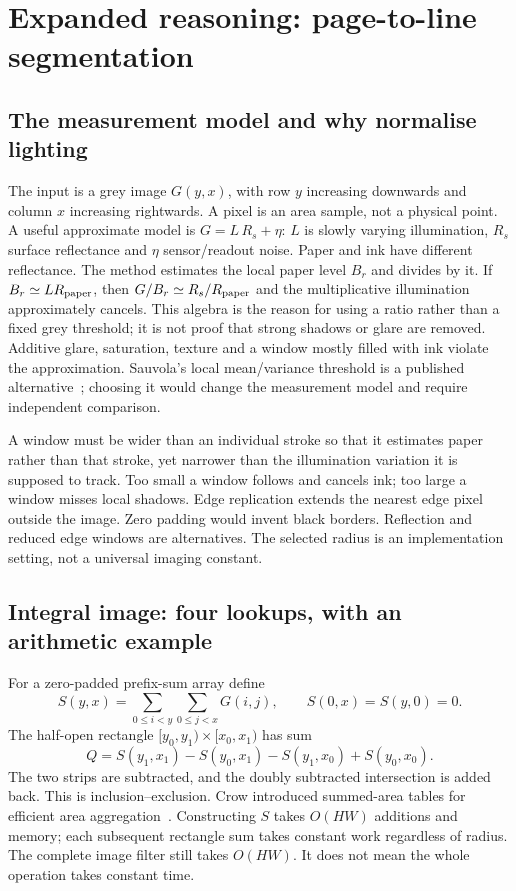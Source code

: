 \section{Expanded reasoning: page-to-line segmentation}
\label{sec:expand-segment}
\subsection{The measurement model and why normalise lighting}
The input is a grey image $G(y,x)$, with row $y$ increasing downwards and
column $x$ increasing rightwards. A pixel is an area sample, not a physical
point. A useful approximate model is $G=L\,R_s+\eta$: $L$ is slowly varying
illumination, $R_s$ surface reflectance and $\eta$ sensor/readout noise.
Paper and ink have different reflectance. The method estimates the local
paper level $B_r$ and divides by it. If $B_r\simeq L R_{\rm paper}$,
then $G/B_r\simeq R_s/R_{\rm paper}$ and the multiplicative illumination
approximately cancels. This algebra is the reason for using a ratio rather
than a fixed grey threshold; it is not proof that strong shadows or glare
are removed. Additive glare, saturation, texture and a window mostly filled
with ink violate the approximation. Sauvola's local mean/variance threshold
is a published alternative~\cite{sauvola2000}; choosing it would change the
measurement model and require independent comparison.

A window must be wider than an individual stroke so that it estimates paper
rather than that stroke, yet narrower than the illumination variation it
is supposed to track. Too small a window follows and cancels ink; too large
a window misses local shadows. Edge replication extends the nearest edge
pixel outside the image. Zero padding would invent black borders. Reflection
and reduced edge windows are alternatives. The selected radius is an
implementation setting, not a universal imaging constant.

\subsection{Integral image: four lookups, with an arithmetic example}
For a zero-padded prefix-sum array define
\[
S(y,x)=\sum_{0\leq i<y}\sum_{0\leq j<x}G(i,j),\qquad S(0,x)=S(y,0)=0.
\]
The half-open rectangle $[y_0,y_1)\times[x_0,x_1)$ has sum
\[
Q=S(y_1,x_1)-S(y_0,x_1)-S(y_1,x_0)+S(y_0,x_0).
\]
The two strips are subtracted, and the doubly subtracted intersection is
added back. This is inclusion--exclusion. Crow introduced summed-area tables
for efficient area aggregation~\cite{crow1984}. Constructing $S$ takes
$O(HW)$ additions and memory; each subsequent rectangle sum takes constant
work regardless of radius. The complete image filter still takes $O(HW)$.
It does not mean the whole operation takes constant time.

